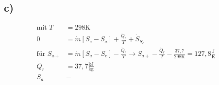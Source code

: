 

\subsection*{c)}
\begin{align*}
    \text{mit } T &= 298 \text{K} \\
    0 &= \dot{m} [S_e - S_a] + \frac{\dot{Q}_r}{T} + \dot{S}_{S_e} \\
    \text{für } S_{a+} &= \dot{m} [S_a - S_e] - \frac{\dot{Q}_r}{T} \rightarrow S_{a+} - \frac{\dot{Q}_r}{T} - \frac{37,7}{298 \text{K}} = 127,8 \frac{\text{J}}{\text{K}} \\
    \dot{Q}_r &= 37,7 \frac{\text{kJ}}{\text{kg}} \\
    S_a &=
\end{align*}